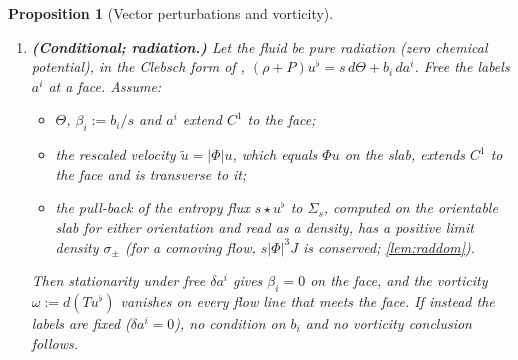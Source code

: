 \documentclass[11pt]{article}
\theoremstyle{canonmath}
\theoremstyle{canonpostulate}
\theoremstyle{canonproposition}
\theoremstyle{canonmath}
\newtheorem{proposition*}[theorem]{Proposition}
\theoremstyle{canonproposition}
\providecommand{\Klein}{\mathcal{K}}
\def\mathcal#1{#1}%
\def\eta{eta}%
\begin{document}
\begin{proposition*}[Vector perturbations and vorticity]
\begin{enumerate}[label=(\roman*)]
\begin{itemize}
  \item \emph{Global removal.} The removal is local, on the slab. Let $R$ be the action of $r$ on $\mathfrak k$ by push-forward. A generator $\xi(\eta)\in\mathfrak k$ descends to $\Klein$ if and only if $\xi(\pi) = R\,\xi(0)$, and it removes the Killing shift if and only if $\xi' = -V$. With the finite integral $J := \int_0^\pi V\,d\eta$ this gives $(R-I)\,\xi(0) = -J$. Since $R^2 = I$, the image of $R-I$ is the kernel of $R+I$. Hence the shift is removable on $\Klein$ if and only if
  \begin{equation}
  (I+R)\,J = 0 .
  \label{eq:holonomy}
  \end{equation}
  Matching of the higher normal jets of $\xi$ follows from $\xi^{(j)} = -V^{(j-1)}$ once the perturbation itself descends smoothly. For $r(x) = (-x^1,x^2,x^3,x^4)$ the $R$-invariant part of $\mathfrak k\cong\mathfrak{so}(4)$ is the $\mathfrak{so}(3)$ of rotations of $(x^2,x^3,x^4)$. Up to three components of $J$ can therefore obstruct global removal. Such holonomies occur on exact solutions (\cref{prop:holonomy}).
  \end{itemize}
\item \textbf{(Conditional; radiation.)} Let the fluid be pure radiation (zero chemical potential), in the Clebsch form of \cite{TBT2026,Schutz1970}, $(\rho+P)u^\flat = s\,d\Theta + b_i\,da^i$. Free the labels $a^i$ at a face. Assume:
  \begin{itemize}
  \item $\Theta$, $\beta_i := b_i/s$ and $a^i$ extend $C^1$ to the face;
  \item the rescaled velocity $\tilde u = |\Phi|u$, which equals $\Phi u$ on the slab, extends $C^1$ to the face and is transverse to it;
  \item the pull-back of the entropy flux $s\star u^\flat$ to $\Sigma_s$, computed on the orientable slab for either orientation and read as a density, has a positive limit density $\sigma_\pm$ (for a comoving flow, $s|\Phi|^3J$ is conserved; \cref{lem:raddom}).
  \end{itemize}
  Then stationarity under free $\delta a^i$ gives $\beta_i = 0$ on the face, and the vorticity $\omega := d(Tu^\flat)$ vanishes on every flow line that meets the face. If instead the labels are fixed ($\delta a^i = 0$), no condition on $b_i$ and no vorticity conclusion follows.
\end{enumerate}
\end{proposition*}
\end{document}
